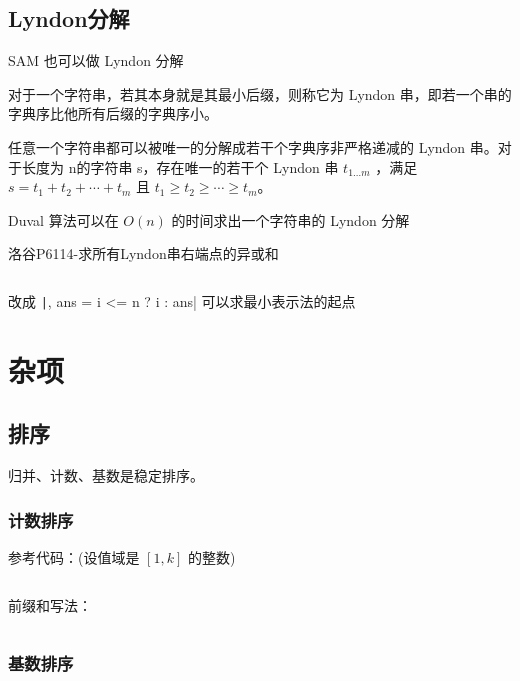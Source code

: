 \documentclass[twocolumn,10pt]{ctexart}
\begin{document}
\inputminted{cpp}{code/p1368_minimal_string.cpp}

\subsection{Lyndon分解}

\begin{notebox}
SAM 也可以做 Lyndon 分解
\end{notebox}

对于一个字符串，若其本身就是其最小后缀，则称它为 Lyndon 串，即若一个串的字典序比他所有后缀的字典序小。

任意一个字符串都可以被唯一的分解成若干个字典序非严格递减的 Lyndon 串。对于长度为 n的字符串 s，存在唯一的若干个 Lyndon 串 $t_{1\dots m}$ ，满足 $s=t_1 + t_2 + \cdots + t_m$ 且 $ t_1 \ge t_2 \ge \cdots \ge t_m$。

Duval 算法可以在 $O(n)$ 的时间求出一个字符串的 Lyndon 分解

\begin{notebox}
洛谷P6114-求所有Lyndon串右端点的异或和
\end{notebox}

\inputminted{cpp}{code/p6114_lyndon.cpp}

\begin{notebox}
改成 \texttt|, ans = i <= n ? i : ans| 可以求最小表示法的起点
\end{notebox}

\section{杂项}

\subsection{排序}

归并、计数、基数是稳定排序。

\subsubsection{计数排序}

参考代码：(设值域是 $[1,k]$ 的整数)

\inputminted{cpp}{code/ext_063.cpp}

前缀和写法：

\inputminted{cpp}{code/ext_064.cpp}

\subsubsection{基数排序}
\end{document}
